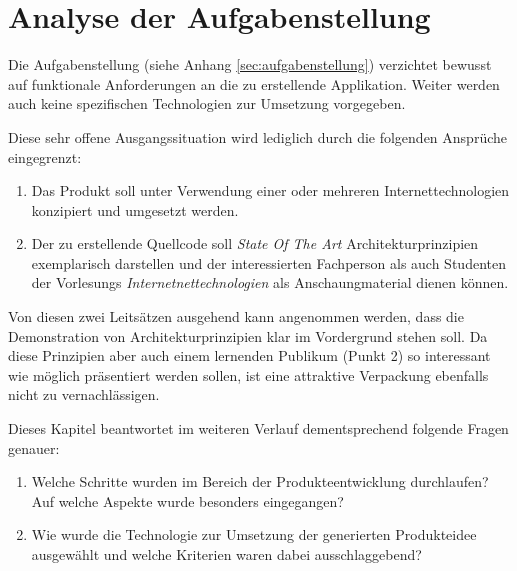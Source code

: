 \chapter{Analyse der Aufgabenstellung}

Die Aufgabenstellung (siehe Anhang \ref{sec:aufgabenstellung}) verzichtet bewusst auf funktionale Anforderungen an die zu erstellende Applikation. Weiter werden auch keine spezifischen Technologien zur Umsetzung vorgegeben.

Diese sehr offene Ausgangssituation wird lediglich durch die folgenden Ansprüche eingegrenzt:

\begin{enumerate}
	\item Das Produkt soll unter Verwendung einer oder mehreren Internettechnologien konzipiert und umgesetzt werden.
	\item Der zu erstellende Quellcode soll \emph{State Of The Art} Architekturprinzipien \cite{ROCA} exemplarisch darstellen und der interessierten Fachperson als auch Studenten der Vorlesungs \emph{Internetnettechnologien} als Anschaungmaterial dienen können.
\end{enumerate}

Von diesen zwei Leitsätzen ausgehend kann angenommen werden, dass die Demonstration von Architekturprinzipien klar im Vordergrund stehen soll. Da diese Prinzipien aber auch einem lernenden Publikum (Punkt 2) so interessant wie möglich präsentiert werden sollen, ist eine attraktive Verpackung ebenfalls nicht zu vernachlässigen.

Dieses Kapitel beantwortet im weiteren Verlauf dementsprechend folgende Fragen genauer:

\begin{enumerate}
	\item Welche Schritte wurden im Bereich der Produkteentwicklung durchlaufen? Auf welche Aspekte wurde besonders eingegangen?
	\item Wie wurde die Technologie zur Umsetzung der generierten Produkteidee ausgewählt und welche Kriterien waren dabei ausschlaggebend?
\end{enumerate}



